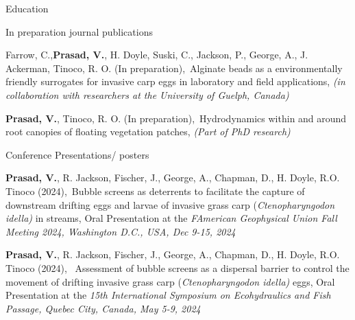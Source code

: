 \documentclass{resume} %
\begin{document}
\begin{rSection}{Education}
\begin{rSection} {In preparation journal publications} \itemsep -2pt

\item Farrow, C.,\textbf{Prasad, V.}, H. Doyle, Suski, C., Jackson, P., George, A., J. Ackerman, Tinoco, R. O. (In preparation),\ {Alginate beads as a environmentally friendly surrogates for invasive carp eggs in laboratory and field applications}, \textit{(in collaboration with researchers at the University of Guelph, Canada)} \\

\item \textbf{Prasad, V.}, Tinoco, R. O. (In preparation),\ {Hydrodynamics within and around root canopies of floating vegetation patches}, \textit{(Part of PhD research)} \\



\end{rSection}


\begin{rSection}{Conference Presentations/ posters} \itemsep -2pt
\item \textbf{Prasad, V.}, R. Jackson, Fischer, J., George, A., Chapman, D., H. Doyle, R.O. Tinoco (2024),\ Bubble screens as deterrents to facilitate the capture of downstream drifting eggs and larvae of invasive grass carp  (\textit{Ctenopharyngodon idella)} in streams, Oral Presentation at the \textit{FAmerican Geophysical Union Fall Meeting 2024, Washington D.C., USA, Dec 9-15, 2024}\\

\item \textbf{Prasad, V.}, R. Jackson, Fischer, J., George, A., Chapman, D., H. Doyle, R.O. Tinoco (2024), \ Assessment of bubble screens as a dispersal barrier to control the movement of drifting invasive grass carp (\textit{Ctenopharyngodon idella)} eggs, Oral Presentation at the \textit{15th International Symposium on Ecohydraulics and Fish Passage, Quebec City, Canada, May 5-9, 2024}\\


\end{rSection}
\end{rSection}
\end{document}
